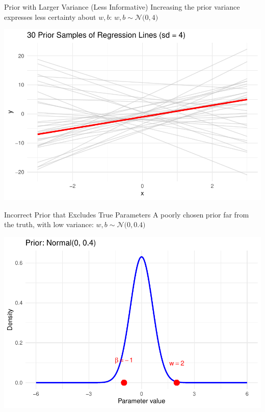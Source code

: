 \documentclass{beamer}
\begin{document}
\begin{frame}{Prior with Larger Variance (Less Informative)}
  Increasing the prior variance expresses less certainty about \(w, b\):
  \(
    w, b \sim \mathcal{N}\big(0, 4\big)
  \)

  \begin{center}
    \includegraphics[width=0.8\linewidth]{prior_2_2.pdf}
  \end{center}
\end{frame}

\begin{frame}{Incorrect Prior that Excludes True Parameters}
  A poorly chosen prior far from the truth, with low variance:
  \(
    w, b \sim \mathcal{N}\big(0, 0.4\big)
  \)


  \begin{center}
    \includegraphics[width=0.8\linewidth]{prior_1_3.pdf}
  \end{center}
\end{frame}
\end{document}
